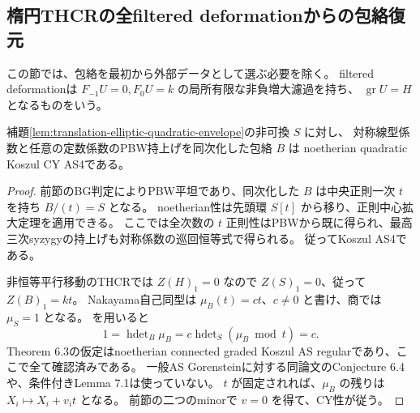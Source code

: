 \subsection{楕円THCRの全filtered deformationからの包絡復元}
\label{subsec:filtered-elliptic-recognition}
この節では、包絡を最初から外部データとして選ぶ必要を除く。
filtered deformationは $F_{-1}U=0,F_0U=k$ の局所有限な非負増大濾過を持ち、
$\operatorname{gr}U=H$ となるものをいう。

\begin{lemma}[非可換平行移動型の全中央PBW包絡はCY]
\label{lem:sklyanin-central-PBW-CY}
補題\ref{lem:translation-elliptic-quadratic-envelope}の非可換 $S$ に対し、
対称線型係数と任意の定数係数のPBW持上げを同次化した包絡 $B$ は
noetherian quadratic Koszul CY AS4である。
\end{lemma}
\begin{proof}
前節のBG判定によりPBW平坦であり、同次化した $B$ は中央正則一次 $t$ を持ち $B/(t)=S$ となる。
noetherian性は先頭環 $S[t]$ から移り、正則中心拡大定理\cite{LBS}を適用できる。
ここでは全次数の $t$ 正則性はPBWから既に得られ、最高三次syzygyの持上げも対称係数の巡回恒等式で得られる。
従ってKoszul AS4である。

非恒等平行移動のTHCRでは $Z(H)_1=0$ なので $Z(S)_1=0$、従って $Z(B)_1=kt$。
Nakayama自己同型は $\mu_B(t)=c t$、$c\ne0$ と書け、商では $\mu_S=1$ となる。
\cite[(E3.9.1), Theorem 6.3]{RRZ}を用いると
\[
 1=\operatorname{hdet}_B\mu_B
   =c\operatorname{hdet}_S(\mu_B\bmod t)=c.
\]
Theorem 6.3の仮定はnoetherian connected graded Koszul AS regularであり、ここで全て確認済みである。
一般AS Gorensteinに対する同論文のConjecture 6.4や、条件付きLemma 7.1は使っていない。
$t$ が固定されれば、$\mu_B$ の残りは $X_i\mapsto X_i+v_i t$ となる。
前節の二つのminorで $v=0$ を得て、CY性が従う。
\end{proof}

